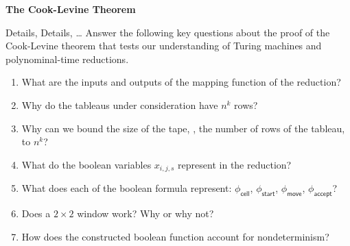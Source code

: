 \documentclass[11pt]{book}
\newcommand{\doctitle}{The Cook-Levine Theorem}
\begin{document}
\begin{center}
  \large\textbf{{\doctitle}}
\end{center}

\vspace{2em}


\newcommand{\desc}[1]{\ensuremath{\langle #1 \rangle}}
\newcommand{\NP}{\ensuremath{\mathsf{NP}}\xspace}
\newcommand{\lang}[1]{\ensuremath{\mathsf{#1}}\xspace}


\begin{problem}{Details, Details, \ldots}
  Answer the following key questions about the proof of the Cook-Levine theorem that tests our understanding of Turing machines and polynominal-time reductions.
  \begin{enumerate}[label=(\alph*)]
    \item What are the inputs and outputs of the mapping function of the reduction?
    \item Why do the tableaus under consideration have \( n^k \) rows?
    \item Why can we bound the size of the tape, \ie, the number of rows of the tableau, to \( n^k \)?
    \item What do the boolean variables \( x_{i, j, s} \) represent in the reduction?
    \item What does each of the boolean formula represent: \( \phi_\mathsf{cell} \), \( \phi_{\mathsf{start}} \), \( \phi_{\mathsf{move}} \), \( \phi_{\mathsf{accept}} \)?
    \item Does a \( 2 \times 2 \) window work?
      Why or why not?
    \item How does the constructed boolean function account for nondeterminism?
  \end{enumerate}
\end{problem}
\end{document}
